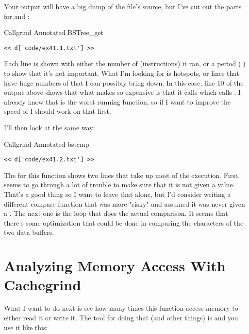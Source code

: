 Your output will have a big dump of the file's source, but I've cut out
the parts for  and :

\begin{code}{Callgrind Annotated BSTree\_get}
\begin{Verbatim}
<< d['code/ex41.1.txt'] >>
\end{Verbatim}
\end{code}

Each line is shown with either the number of  (instructions) it
ran, or a period (.) to show that it's not important.  What I'm looking for
is hotspots, or lines that have huge numbers of  that I can
possibly bring down.  In this case, line 10 of the output above shows that
what makes  so expensive is that it calls 
 which calls .  I already know that
 is the worst running function, so if I want to 
improve the speed of  I should work on that first.

I'll then look at  the same way:

\begin{code}{Callgrind Annotated bstcmp}
\begin{Verbatim}
<< d['code/ex41.2.txt'] >>
\end{Verbatim}
\end{code}

The  for this function shows two lines that take up most
of the execution.  First,  seems to go through a lot
of trouble to make sure that it is not given a  value.
That's a good thing so I want to leave that alone, but I'd consider
writing a different compare function that was more "risky" and assumed
it was never given a .  The next one is the loop that
does the actual comparison.  It seems that there's some optimization
that could be done in comparing the characters of the two data buffers.

\section{Analyzing Memory Access With Cachegrind}

What I want to do next is see how many times this  function
access memory to either read it or write it.  The tool for doing that (and
other things) is  and you use it like this:

